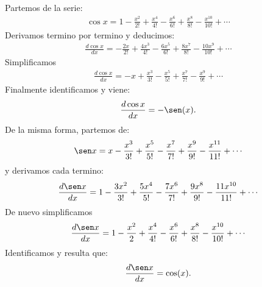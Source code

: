 \documentclass[12pt, a4paper]{article}
\theoremstyle{rioplatense}
\newtheorem{ejemplo}{Ejemplo}[section]
\begin{document}
Partemos de la serie:
\begin{align*}
\cos x = 
1 
- \frac{x^2}{2!}
+ \frac{x^4}{4!} 
- \frac{x^6}{6!} 
+ \frac{x^8}{8!} 
- \frac{x^{10}}{10!} 
+ \cdots
\end{align*}
Derivamos termino por termino y 
deducimos:
\begin{align*}
\frac{d\cos x}{dx} = 
- \frac{2x}{2!}
+ \frac{4x^3}{4!} 
- \frac{6x^5}{6!} 
+ \frac{8x^7}{8!} 
- \frac{10x^{9}}{10!} 
+ \cdots
\end{align*}
Simplificamos
\begin{align*}
\frac{d\cos x}{dx} = 
- {x}
+ \frac{x^3}{3!} 
- \frac{x^5}{5!} 
+ \frac{x^7}{7!} 
- \frac{x^{9}}{9!} 
+ \cdots
\end{align*}
Finalmente identificamos y viene:
\[
\frac{d\cos x}{dx} = -\sen(x).
\]
De la misma forma, partemos de:
\begin{align*}
\sen x = 
x 
- \frac{x^3}{3!} 
+ \frac{x^5}{5!} 
- \frac{x^7}{7!} 
+ \frac{x^9}{9!} 
- \frac{x^{11}}{11!} 
+ \cdots
\end{align*}
y derivamos cada termino:
\begin{align*}
\frac{d\sen x}{dx} = 
1 
- \frac{3x^2}{3!} 
+ \frac{5x^4}{5!} 
- \frac{7x^6}{7!} 
+ \frac{9x^8}{9!} 
- \frac{11x^{10}}{11!} 
+ \cdots
\end{align*}
De nuevo simplificamos
\begin{align*}
\frac{d\sen x}{dx} = 
1 
- \frac{x^2}{2} 
+ \frac{x^4}{4!} 
- \frac{x^6}{6!} 
+ \frac{x^8}{8!} 
- \frac{x^{10}}{10!} 
+ \cdots
\end{align*}
Identificamos y resulta que:
\[
\frac{d\sen x}{dx} = \cos(x).
\]
%



\end{document}
